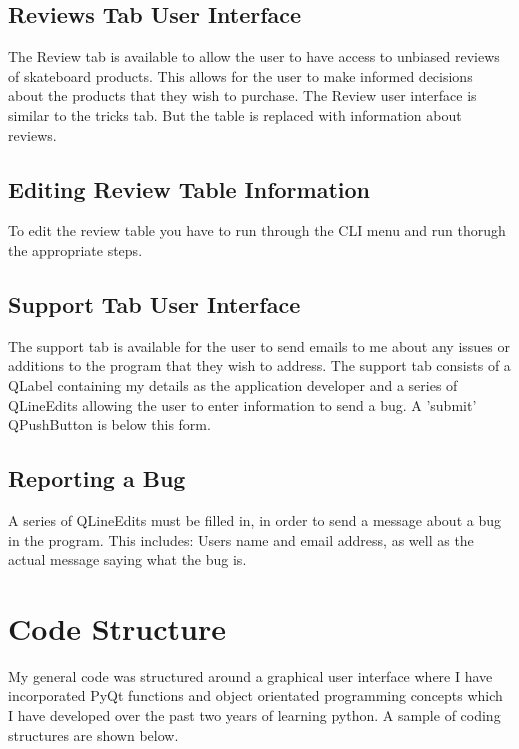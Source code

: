 \subsection{Reviews Tab User Interface}

The Review tab is available to allow the user to have access to unbiased reviews of skateboard products. This allows for the user to make informed decisions about the products that they wish to purchase. The Review user interface is similar to the tricks tab. But the table is replaced with information about reviews.

\subsection{Editing Review Table Information}

To edit the review table you have to run through the CLI menu and run thorugh the appropriate steps.



\subsection{Support Tab User Interface}

The support tab is available for the user to send emails to me about any issues or additions to the program that they wish to address. The support tab consists of a QLabel containing my details as the application developer and a series of QLineEdits allowing the user to enter information to send a bug. A 'submit' QPushButton is below this form.

\subsection{Reporting a Bug}

A series of QLineEdits must be filled in, in order to send a message about a bug in the program. This includes: Users name and email address, as well as the actual message saying what the bug is. 










\section{Code Structure}

My general code was structured around a graphical user interface where I have incorporated PyQt functions and object orientated programming concepts which I have developed over the past two years of learning python. A sample of coding structures are shown below.


